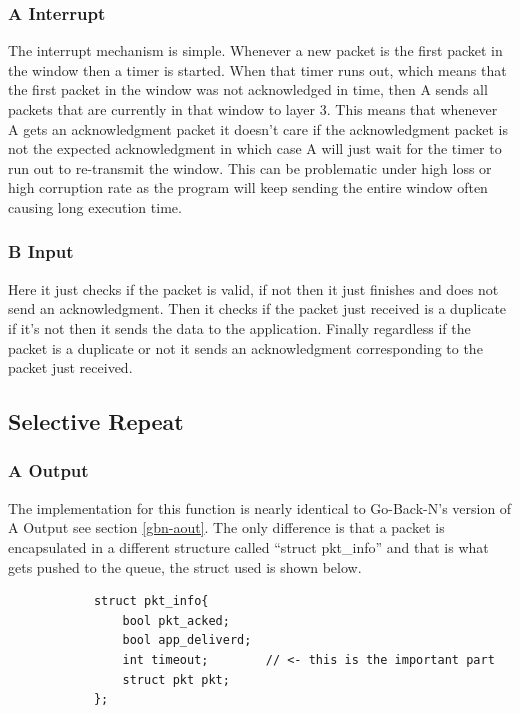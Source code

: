 \documentclass[10pt, a4paper]{article}
\begin{document}
    \subsubsection{A Interrupt\label{gbn-aint}}
        The interrupt mechanism is simple. Whenever a new packet is the first packet in the window then a timer is started. When that timer runs out, which means that the first packet in the window was not acknowledged in time, then A sends all packets that are currently in that window to layer 3. This means that whenever A gets an acknowledgment packet it doesn't care if the acknowledgment packet is not the expected acknowledgment in which case A will just wait for the timer to run out to re-transmit the window. This can be problematic under high loss or high corruption rate as the program will keep sending the entire window often causing long execution time.
    \subsubsection{B Input\label{gbn-bin}}
        Here it just checks if the packet is valid, if not then it just finishes and does not send an acknowledgment. Then it checks if the packet just received is a duplicate if it's not then it sends the data to the application. Finally regardless if the packet is a duplicate or not it sends an acknowledgment corresponding to the packet just received.

  \subsection{Selective Repeat}
    \subsubsection{A Output\label{sr-aout}}
        The implementation for this function is nearly identical to Go-Back-N's version of A Output  see section \ref{gbn-aout}. The only difference is that a packet is encapsulated in a different structure called ``struct pkt\_info'' and that is what gets pushed to the queue, the struct used is shown below.
        
        \begin{lstlisting}
            struct pkt_info{
                bool pkt_acked;
                bool app_deliverd;
                int timeout;        // <- this is the important part
                struct pkt pkt;
            };
        \end{lstlisting}
\end{document}
